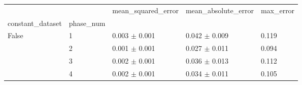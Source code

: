 \begin{tabular}{lllll}
\toprule
 &  & mean_squared_error & mean_absolute_error & max_error \\
constant_dataset & phase_num &  &  &  \\
\midrule
\multirow[t]{4}{*}{False} & 1 & 0.003 $\pm$ 0.001 & 0.042 $\pm$ 0.009 & 0.119 \\
 & 2 & 0.001 $\pm$ 0.001 & 0.027 $\pm$ 0.011 & 0.094 \\
 & 3 & 0.002 $\pm$ 0.001 & 0.036 $\pm$ 0.013 & 0.112 \\
 & 4 & 0.002 $\pm$ 0.001 & 0.034 $\pm$ 0.011 & 0.105 \\
\cline{1-5}
\bottomrule
\end{tabular}
